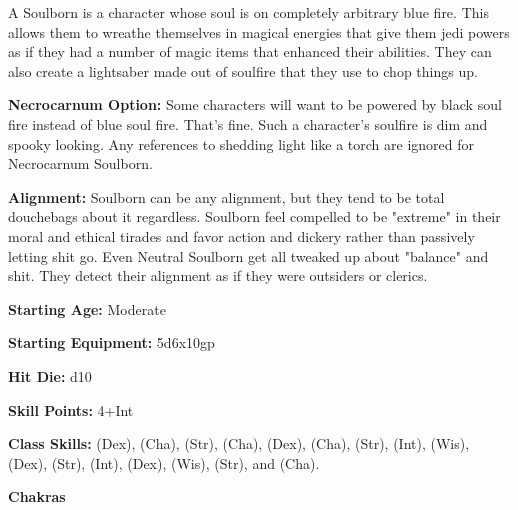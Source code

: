 
A Soulborn is a character whose soul is on completely arbitrary blue fire. This allows them to wreathe themselves in magical energies that give them jedi powers as if they had a number of magic items that enhanced their abilities. They can also create a lightsaber made out of soulfire that they use to chop things up. 

\textbf{Necrocarnum Option:} Some characters will want to be powered by black soul fire instead of blue soul fire. That's fine. Such a character's soulfire is dim and spooky looking. Any references to shedding light like a torch are ignored for Necrocarnum Soulborn. 

\textbf{Alignment:} Soulborn can be any alignment, but they tend to be total douchebags about it regardless. Soulborn feel compelled to be "extreme" in their moral and ethical tirades and favor action and dickery rather than passively letting shit go. Even Neutral Soulborn get all tweaked up about "balance" and shit. They detect their alignment as if they were outsiders or clerics. 

\textbf{Starting Age:} Moderate

\textbf{Starting Equipment:} 5d6x10gp 

\textbf{Hit Die:} d10 

\textbf{Skill Points:} 4+Int 

\textbf{Class Skills:}  (Dex),  (Cha),  (Str),  (Cha),  (Dex),  (Cha),  (Str),  (Int),  (Wis),  (Dex),  (Str),  (Int),  (Dex),  (Wis),  (Str), and  (Cha).

\goodbab{}
\goodfor{}
\poorref{}
\goodwil{}


\begin{extraclasstable}{\textbf{Chakras}}
\end{extraclasstable}

